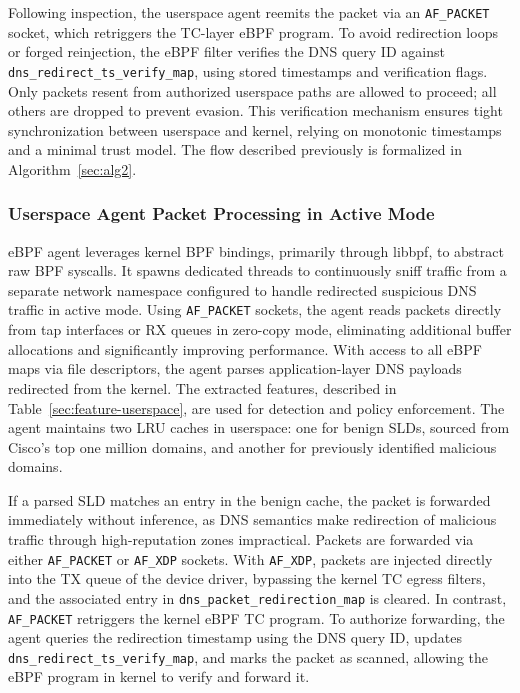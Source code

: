 \documentclass [11pt, proquest] {uwthesis}[2020/02/24]
\begin{document}
Following inspection, the userspace agent reemits the packet via an \texttt{AF\_PACKET} socket, which retriggers the TC-layer eBPF program. To avoid redirection loops or forged reinjection, the eBPF filter verifies the DNS query ID against \texttt{dns\_redirect\_ts\_verify\_map}, using stored timestamps and verification flags. Only packets resent from authorized userspace paths are allowed to proceed; all others are dropped to prevent evasion. This verification mechanism ensures tight synchronization between userspace and kernel, relying on monotonic timestamps and a minimal trust model. The flow described previously is formalized in Algorithm~\ref{sec:alg2}.

\subsubsection{\textbf{Userspace Agent Packet Processing in Active Mode}}
\label{active:sec2}
eBPF agent leverages kernel BPF bindings, primarily through libbpf, to abstract raw BPF syscalls. It spawns dedicated threads to continuously sniff traffic from a separate network namespace configured to handle redirected suspicious DNS traffic in active mode. Using \texttt{AF\_PACKET} sockets, the agent reads packets directly from tap interfaces or RX queues in zero-copy mode, eliminating additional buffer allocations and significantly improving performance. With access to all eBPF maps via file descriptors, the agent parses application-layer DNS payloads redirected from the kernel. The extracted features, described in Table~\ref{sec:feature-userspace}, are used for detection and policy enforcement. The agent maintains two LRU caches in userspace: one for benign SLDs, sourced from Cisco’s top one million domains, and another for previously identified malicious domains. 

If a parsed SLD matches an entry in the benign cache, the packet is forwarded immediately without inference, as DNS semantics make redirection of malicious traffic through high-reputation zones impractical. Packets are forwarded via either \texttt{AF\_PACKET} or \texttt{AF\_XDP} sockets. With \texttt{AF\_XDP}, packets are injected directly into the TX queue of the device driver, bypassing the kernel TC egress filters, and the associated entry in \texttt{dns\_packet\_redirection\_map} is cleared. In contrast, \texttt{AF\_PACKET} retriggers the kernel eBPF TC program. To authorize forwarding, the agent queries the redirection timestamp using the DNS query ID, updates \texttt{dns\_redirect\_ts\_verify\_map}, and marks the packet as scanned, allowing the eBPF program in kernel to verify and forward it.
\end{document}
